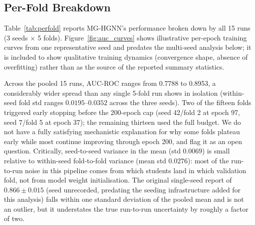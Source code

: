 \documentclass[sigconf,review]{acmart}
\begin{document}
\subsection{Per-Fold Breakdown}

Table~\ref{tab:perfold} reports MG-HGNN's performance
broken down by all 15 runs (3 seeds $\times$ 5 folds).
Figure~\ref{fig:auc_curves} shows illustrative
per-epoch training curves from one representative
seed and predates the multi-seed analysis below; it
is included to show qualitative training dynamics
(convergence shape, absence of overfitting) rather
than as the source of the reported summary statistics.

Across the pooled 15 runs, AUC-ROC ranges from 0.7788
to 0.8953, a considerably wider spread than any single
5-fold run shows in isolation (within-seed fold std
ranges $0.0195$--$0.0352$ across the three seeds). Two
of the fifteen folds triggered early stopping before
the 200-epoch cap (seed 42/fold 2 at epoch 97, seed
7/fold 5 at epoch 37); the remaining thirteen used the
full budget. We do not have a fully satisfying
mechanistic explanation for why some folds plateau
early while most continue improving through epoch 200,
and flag it as an open question. Critically, seed-to-seed
variance in the mean (std $0.0069$) is small relative to
within-seed fold-to-fold variance (mean std $0.0276$):
most of the run-to-run noise in this pipeline comes from
which students land in which validation fold, not from
model weight initialisation. The original single-seed
report of $0.866 \pm 0.015$ (seed unrecorded, predating
the seeding infrastructure added for this analysis) falls
within one standard deviation of the pooled mean and is
not an outlier, but it understates the true run-to-run
uncertainty by roughly a factor of two.
\end{document}
